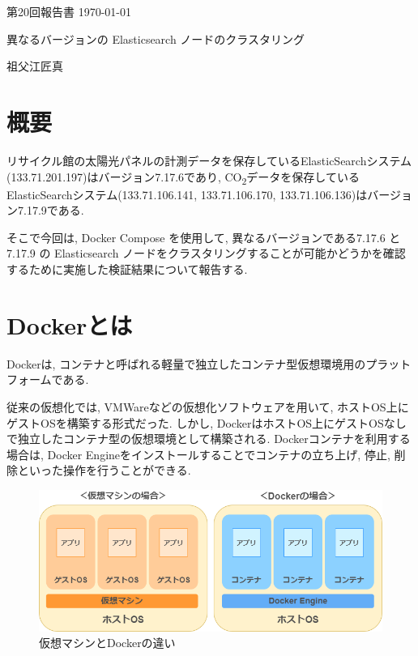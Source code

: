 \documentclass[a4j,12pt,]{jarticle}
\begin{document}
{\noindent\small 第20回報告書 \hfill\today}
\begin{center}
  {\Large 異なるバージョンの Elasticsearch ノードのクラスタリング}
\end{center}
\begin{flushright}
  祖父江匠真 \\
\end{flushright}

\section{概要}
リサイクル館の太陽光パネルの計測データを保存しているElasticSearchシステム(133.71.201.197)はバージョン7.17.6であり, CO\textsubscript{2}データを保存しているElasticSearchシステム(133.71.106.141, 133.71.106.170, 133.71.106.136)はバージョン7.17.9である.

そこで今回は, Docker Compose を使用して, 異なるバージョンである7.17.6 と 7.17.9 の Elasticsearch ノードをクラスタリングすることが可能かどうかを確認するために実施した検証結果について報告する.

\section{Dockerとは}
Dockerは, コンテナと呼ばれる軽量で独立したコンテナ型仮想環境用のプラットフォームである.

従来の仮想化では, VMWareなどの仮想化ソフトウェアを用いて, ホストOS上にゲストOSを構築する形式だった.
しかし, DockerはホストOS上にゲストOSなしで独立したコンテナ型の仮想環境として構築される.
Dockerコンテナを利用する場合は, Docker Engineをインストールすることでコンテナの立ち上げ, 停止, 削除といった操作を行うことができる.

\begin{figure}[H]
  \begin{center}
    \includegraphics[width=160mm]{docker-vmware.png}
    \caption{仮想マシンとDockerの違い \cite{2}}
    \label{p0}
  \end{center}
\end{figure}
\end{document}
